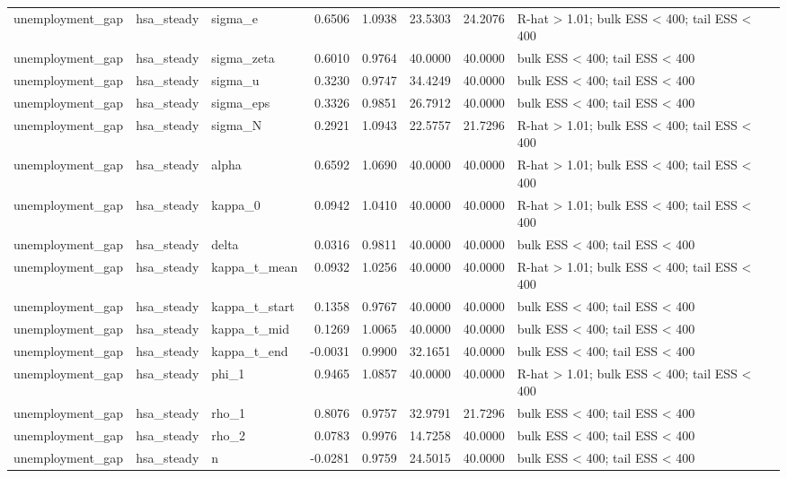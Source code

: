 \begin{tabular}{lllrrrrl}
unemployment\_gap & hsa\_steady & sigma\_e & 0.6506 & 1.0938 & 23.5303 & 24.2076 & R-hat > 1.01; bulk ESS < 400; tail ESS < 400 \\
unemployment\_gap & hsa\_steady & sigma\_zeta & 0.6010 & 0.9764 & 40.0000 & 40.0000 & bulk ESS < 400; tail ESS < 400 \\
unemployment\_gap & hsa\_steady & sigma\_u & 0.3230 & 0.9747 & 34.4249 & 40.0000 & bulk ESS < 400; tail ESS < 400 \\
unemployment\_gap & hsa\_steady & sigma\_eps & 0.3326 & 0.9851 & 26.7912 & 40.0000 & bulk ESS < 400; tail ESS < 400 \\
unemployment\_gap & hsa\_steady & sigma\_N & 0.2921 & 1.0943 & 22.5757 & 21.7296 & R-hat > 1.01; bulk ESS < 400; tail ESS < 400 \\
unemployment\_gap & hsa\_steady & alpha & 0.6592 & 1.0690 & 40.0000 & 40.0000 & R-hat > 1.01; bulk ESS < 400; tail ESS < 400 \\
unemployment\_gap & hsa\_steady & kappa\_0 & 0.0942 & 1.0410 & 40.0000 & 40.0000 & R-hat > 1.01; bulk ESS < 400; tail ESS < 400 \\
unemployment\_gap & hsa\_steady & delta & 0.0316 & 0.9811 & 40.0000 & 40.0000 & bulk ESS < 400; tail ESS < 400 \\
unemployment\_gap & hsa\_steady & kappa\_t\_mean & 0.0932 & 1.0256 & 40.0000 & 40.0000 & R-hat > 1.01; bulk ESS < 400; tail ESS < 400 \\
unemployment\_gap & hsa\_steady & kappa\_t\_start & 0.1358 & 0.9767 & 40.0000 & 40.0000 & bulk ESS < 400; tail ESS < 400 \\
unemployment\_gap & hsa\_steady & kappa\_t\_mid & 0.1269 & 1.0065 & 40.0000 & 40.0000 & bulk ESS < 400; tail ESS < 400 \\
unemployment\_gap & hsa\_steady & kappa\_t\_end & -0.0031 & 0.9900 & 32.1651 & 40.0000 & bulk ESS < 400; tail ESS < 400 \\
unemployment\_gap & hsa\_steady & phi\_1 & 0.9465 & 1.0857 & 40.0000 & 40.0000 & R-hat > 1.01; bulk ESS < 400; tail ESS < 400 \\
unemployment\_gap & hsa\_steady & rho\_1 & 0.8076 & 0.9757 & 32.9791 & 21.7296 & bulk ESS < 400; tail ESS < 400 \\
unemployment\_gap & hsa\_steady & rho\_2 & 0.0783 & 0.9976 & 14.7258 & 40.0000 & bulk ESS < 400; tail ESS < 400 \\
unemployment\_gap & hsa\_steady & n & -0.0281 & 0.9759 & 24.5015 & 40.0000 & bulk ESS < 400; tail ESS < 400 \\

\end{tabular}
